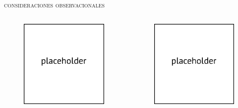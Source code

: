 \documentclass[xcolor=dvipsnames,4pt,hyperref={colorlinks,citecolor=black,linkcolor=black,urlcolor=black}]{beamer}
\begin{document}
\begin{frame}{\textsc{consideraciones observacionales}}
\begin{columns}
\begin{figure}
\includegraphics[scale=0.5]{img/placeholder}
\end{figure}

\begin{figure}
\includegraphics[scale=0.5]{img/placeholder}
\end{figure}

\end{columns}

\end{frame}
\end{document}
